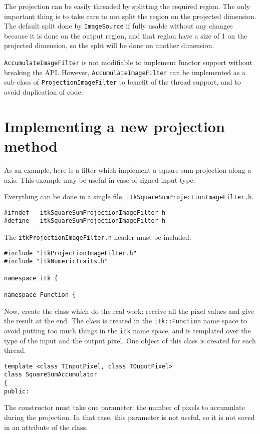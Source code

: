 \documentclass{InsightArticle}
\begin{document}
The projection can be easily threaded by splitting the required region. The
only important thing is to take care to not split the region on the projected
dimension.
The default split done by \verb$ImageSource$ if fully usable without any changes
because it is done on the output region, and that region have a size of 1 on
the projected dimension, so the split will be done on another dimension.

\verb$AccumulateImageFilter$ is not modifiable to implement functor support without
breaking the API. However, \verb$AccumulateImageFilter$ can be implemented as a
sub-class of \verb$ProjectionImageFilter$ to benefit of the thread support, and to
avoid duplication of code.

\section{Implementing a new projection method}
As an example, here is a filter which implement a square sum projection along a
axis. This example may be useful in case of signed input type.

Everything can be done in a single file, \verb$itkSquareSumProjectionImageFilter.h$.
\small \begin{verbatim}
#ifndef __itkSquareSumProjectionImageFilter_h
#define __itkSquareSumProjectionImageFilter_h
\end{verbatim} \normalsize
The \verb$itkProjectionImageFilter.h$ header must be included.
\small \begin{verbatim}
#include "itkProjectionImageFilter.h"
#include "itkNumericTraits.h"

namespace itk {

namespace Function {
\end{verbatim} \normalsize
Now, create the class which do the real work: receive all the pixel values and
give the result at the end. The class is created in the \verb$itk::Function$ name space
to avoid putting too much things in the \verb$itk$ name space, and is templated over the
type of the input and the output pixel.
One object of this class is created for each thread.
\small \begin{verbatim}
template <class TInputPixel, class TOuputPixel>
class SquareSumAccumulator
{
public:
\end{verbatim} \normalsize
The constructor must take one parameter: the number of pixels to accumulate
during the projection. In that case, this parameter is not useful, so it is not
saved in an attribute of the class.
\end{document}
